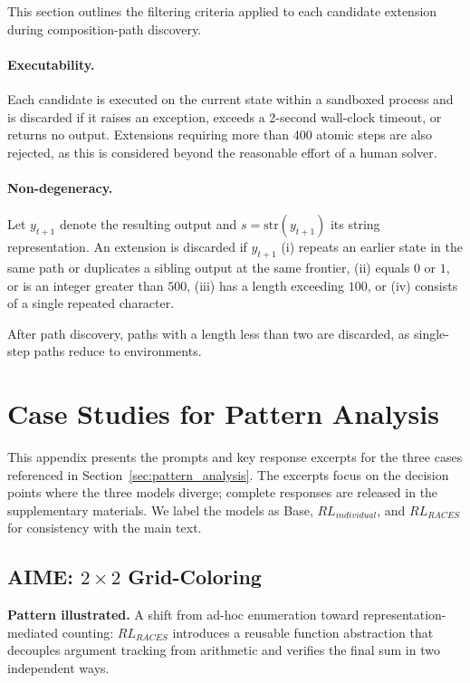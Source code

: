 This section outlines the filtering criteria applied to each candidate extension during composition-path discovery.

\paragraph{Executability.} Each candidate is executed on the current state within a sandboxed process and is discarded if it raises an exception, exceeds a 2-second wall-clock timeout, or returns no output. Extensions requiring more than 400 atomic steps are also rejected, as this is considered beyond the reasonable effort of a human solver.

\paragraph{Non-degeneracy.} Let $y_{t+1}$ denote the resulting output and $s = \mathrm{str}(y_{t+1})$ its string representation. An extension is discarded if $y_{t+1}$ (i) repeats an earlier state in the same path or duplicates a sibling output at the same frontier, (ii) equals $0$ or $1$, or is an integer greater than $500$, (iii) has a length exceeding $100$, or (iv) consists of a single repeated character.

After path discovery, paths with a length less than two are discarded, as single-step paths reduce to environments.

\section{Case Studies for Pattern Analysis}
\label{app:cases}

This appendix presents the prompts and key response excerpts for the three cases referenced in Section~\ref{sec:pattern_analysis}.
The excerpts focus on the decision points where the three models diverge; complete responses are released in the supplementary materials. We label the models as Base, $RL_{individual}$, and $RL_{RACES}$ for consistency with the main text.

\subsection{AIME: \texorpdfstring{$2\times2$}{2x2} Grid-Coloring}
\label{app:case-grid-coloring}

\textbf{Pattern illustrated.} A shift from ad-hoc enumeration toward representation-mediated counting: $RL_{RACES}$ introduces a reusable function abstraction that decouples argument tracking from arithmetic and verifies the final sum in two independent ways.

